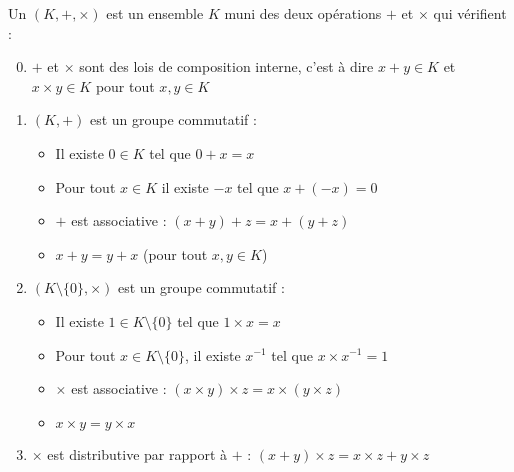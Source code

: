 \begin{frame}
\begin{mydefinition}
 Un  $(K,+,\times)$ est un ensemble $K$
 muni des deux opérations $+$ et $\times$ 
 qui vérifient :
 \pause
 \begin{enumerate}  
 \setcounter{enumi}{-1}
  \item $+$ et $\times$ sont des lois de composition interne, c'est à dire
  $x+y \in K$ et $x\times y \in K$ pour tout $x,y \in K$
  \pause
   \item $(K,+)$ est un groupe commutatif
   \pause :
   \begin{itemize}
      \item Il existe $0 \in K$ tel que $0+x = x$
      
      \item Pour tout $x\in K$ il existe $-x$ tel que $x+(-x)=0$
      
      \item $+$ est associative : $(x+y)+z = x + (y+z)$
      
      \item $x+y=y+x$ (pour tout $x,y \in K$)
    \end{itemize} 
  \pause
  \item $(K\setminus\{0\},\times)$ est un groupe commutatif 
  \pause :  
     \begin{itemize} 
      \item Il existe $1 \in K\setminus\{0\}$ tel que $1 \times x = x$
      
      \item Pour tout $x\in K\setminus\{0\}$, il existe $x^{-1}$ tel que $x\times x^{-1}=1$
      
      \item $\times$ est associative : $(x\times y)\times z = x \times (y \times z)$
      
      \item $x \times y = y \times x$
    \end{itemize} 
  
  \pause
  \item $\times$ est distributive par rapport à $+$ : $(x+y)\times z= x\times z + y\times z$

 \end{enumerate}

\end{mydefinition}

\end{frame}


